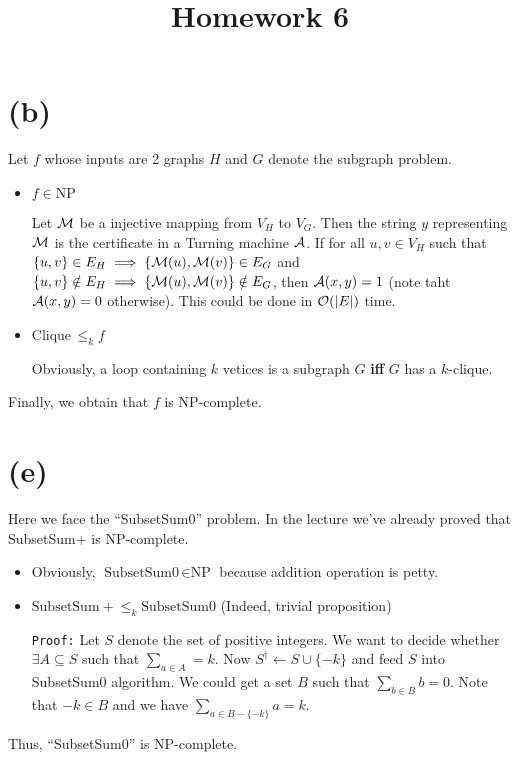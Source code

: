 \documentclass{article}
\begin{document}
\title{Homework 6}
\maketitle

\section*{(b)}
Let $f$ whose inputs are 2 graphs $H$ and $G$ denote the subgraph problem.
\begin{itemize}
	\item $f\in\text{NP}$

		Let $\mathcal{M}$ be a injective mapping from $V_H$ to $V_G$. Then the string $y$ representing $\mathcal{M}$ is the certificate in a Turning machine $\mathcal{A}$.
		If for all $u,v\in V_H$ such that $\{u,v\}\in E_H\implies \{\mathcal{M}(u),\mathcal{M}(v)\}\in E_G$ and $\{u,v\}\notin E_H\implies\{\mathcal{M}(u),\mathcal{M}(v)\}\notin E_G$, then $\mathcal{A}(x,y)=1$ (note taht $\mathcal{A}(x,y)=0$ otherwise).
		This could be done in $\mathcal{O}(\qty|E|)$ time.

	\item $\text{Clique}\,\le_k f$

		Obviously, a loop containing $k$ vetices is a subgraph  $G$ \textbf{iff} $G$ has a $k$-clique.
\end{itemize}

Finally, we obtain that $f$ is NP-complete.

\section*{(e)}
Here we face the ``SubsetSum0'' problem. In the lecture we've already proved that SubsetSum+ is NP-complete.

 \begin{itemize}
	 \item Obviously, $\text{SubsetSum0}\,\in\text{NP}$ because addition operation is petty.
	 \item
		 $\text{SubsetSum}+ \le_k \text{SubsetSum}0$ (Indeed, trivial proposition)

		 \texttt{Proof:}
		 Let $S$ denote the set of positive integers. We want to decide whether $\exists A\subseteq S$ such that $\sum_{a\in A}=k$.
		 Now $S^\dagger \gets S\cup\{-k\}$ and feed $S$ into  SubsetSum0 algorithm. We could get a set $B$ such that $\sum_{b\in B}b=0$. Note that $-k\in B$ and we have  $\sum_{a\in B-\{-k\}}a=k$.
\end{itemize}
Thus, ``SubsetSum0'' is NP-complete.
\end{document}
